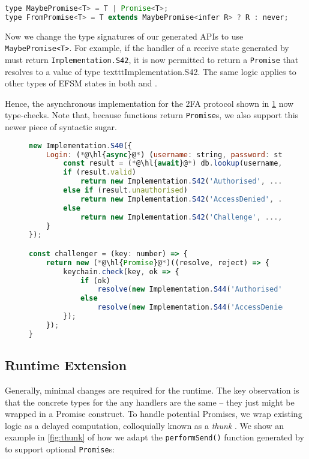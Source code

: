 \begin{lstlisting}[language=javascript,numbers=none]
type MaybePromise<T> = T | Promise<T>;
type FromPromise<T> = T extends MaybePromise<infer R> ? R : never;
\end{lstlisting}

Now we change the type signatures of our generated APIs
to use \texttt{MaybePromise<T>}.
For example, if the handler of a receive state generated by
 must return \texttt{Implementation.S42},
it is now permitted to return a \texttt{Promise} that resolves
to a value of type texttt{Implementation.S42}.
The same logic applies to other types of EFSM states
in both  and .

Hence, the asynchronous  implementation
for the 2FA protocol shown in \cref{lst:new2fa}
now type-checks. Note that, because 
 functions return \texttt{Promise}s,
we also support this newer piece of syntactic sugar.

\begin{figure}[!h]
\begin{lstlisting}[language=javascript,tabsize=2]
new Implementation.S40({
	Login: (*@\hl{async}@*) (username: string, password: string) => {
		const result = (*@\hl{await}@*) db.lookup(username, password);
		if (result.valid)
			return new Implementation.S42('Authorised', ...);
		else if (result.unauthorised)
			return new Implementation.S42('AccessDenied', ...);
		else
			return new Implementation.S42('Challenge', ..., challenger);
	}
});

const challenger = (key: number) => {
	return new (*@\hl{Promise}@*)((resolve, reject) => {
		keychain.check(key, ok => {
			if (ok)
				resolve(new Implementation.S44('Authorised', ...);
			else 
				resolve(new Implementation.S44('AccessDenied', ...);	
		});
	});
}
\end{lstlisting}
\label{lst:new2fa}
\end{figure}

\subsection{Runtime Extension}
\label{subsection:asyncruntime}

Generally, minimal changes are required for the runtime.
The key observation is that the concrete types for the any
handlers are the same -- they just might be wrapped in a Promise
construct.
To handle potential Promises, we wrap existing logic
as a delayed computation, colloquially known as a \textit{thunk}
\cite{Thunk}.
We show an example in \cref{fig:thunk} of how we
adapt the \texttt{performSend()} function generated by
 to support optional \texttt{Promise}s:

